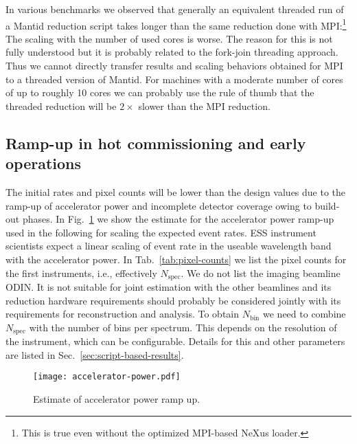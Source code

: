 \documentclass[a4paper,english,numbers=noenddot,bibliography=totoc,chapterprefix=on,DIV=12]{scrartcl}
\newcommand{\Nbin}{N_{\text{bin}}}
\newcommand{\Nspec}{N_{\text{spec}}}
\newcommand{\odin}{ODIN\xspace}
\newcommand{\mantid}{Mantid\xspace}
\begin{document}
In various benchmarks we observed that generally an equivalent threaded run of a \mantid reduction script takes longer than the same reduction done with MPI:\footnote{This is true even without the optimized MPI-based NeXus loader.}
The scaling with the number of used cores is worse.
The reason for this is not fully understood but it is probably related to the fork-join threading approach.
Thus we cannot directly transfer results and scaling behaviors obtained for MPI to a threaded version of \mantid.
For machines with a moderate number of cores of up to roughly 10 cores we can probably use the rule of thumb that the threaded reduction will be $2\times$ slower than the MPI reduction.


\subsection{Ramp-up in hot commissioning and early operations}

The initial rates and pixel counts will be lower than the design values due to the ramp-up of accelerator power and incomplete detector coverage owing to build-out phases.
In Fig.~\ref{fig:accelerator-power} we show the estimate for the accelerator power ramp-up used in the following for scaling the expected event rates.
ESS instrument scientists expect a linear scaling of event rate in the useable wavelength band with the accelerator power.
In Tab.~\ref{tab:pixel-counts} we list the pixel counts for the first instruments, i.e., effectively $\Nspec$.
We do not list the imaging beamline \odin.
It is not suitable for joint estimation with the other beamlines and its reduction hardware requirements should probably be considered jointly with its requirements for reconstruction and analysis.
To obtain $\Nbin$ we need to combine $\Nspec$ with the number of bins per spectrum.
This depends on the resolution of the instrument, which can be configurable.
Details for this and other parameters are listed in Sec.~\ref{sec:script-based-results}.

\begin{figure}
  \centering
\texttt{[image: accelerator-power.pdf]}
\caption{\label{fig:accelerator-power}Estimate of accelerator power ramp up.}
\end{figure}
\end{document}
